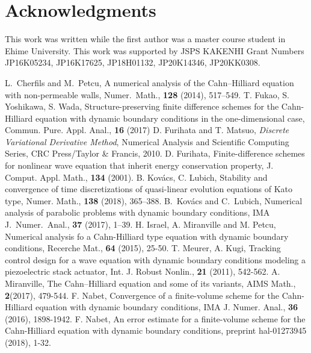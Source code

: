 \documentclass[dvipdfmx-if-dvi,autodetect-engine,ja=standard]{amsart}
\numberwithin{equation}{section} %
\begin{document}
\section*{Acknowledgments}
This work was written while
the first author was a master course student in
Ehime University.
This work was supported by JSPS KAKENHI Grant Numbers 
JP16K05234,
JP16K17625,
JP18H01132,
JP20K14346, 
JP20KK0308.








\begin{thebibliography}{9}
  L.\ Cherfils and M.\ Petcu, \textrm{A numerical analysis of the Cahn--Hilliard equation with non-permeable walls, } Numer.\ Math., {\bf 128} (2014), 517--549. 
   T. Fukao, S. Yoshikawa, S. Wada, Structure-preserving finite difference schemes for the Cahn-Hilliard equation with dynamic boundary conditions in the one-dimensional case, Commun. Pure. Appl. Anal., \textbf{16} (2017)
   D. Furihata and T. Matsuo, {\it Discrete Variational Derivative Method}, Numerical Analysis and Scientific Computing Series, CRC Press/Taylor \& Francis, 2010. 
   D. Furihata, Finite-difference schemes for nonlinear wave equation that inherit energy conservation property, J. Comput. Appl. Math., \textbf{134} (2001).
   B. Kov{\'{a}}cs, C. Lubich, \textrm{Stability and convergence of time discretizations of quasi-linear evolution equations of Kato type, } 
  Numer. Math., \textbf{138} (2018), 365--388. 
   B.\ Kov\'{a}cs and C.\ Lubich, \textrm{Numerical analysis of parabolic problems with dynamic boundary conditions, }IMA J.\ Numer.\ Anal., {\bf 37} (2017), 1--39. 
   H. Israel, A. Miranville and M. Petcu, Numerical analysis fo a Cahn-Hilliard type equation with dynamic boundary conditions, Recerche Mat., \textbf{64} (2015), 25-50.  
   T. Meurer, A. Kugi, Tracking control design for a wave equation with dynamic boundary conditions modeling a piezoelectric stack actuator, Int. J. Robust Nonlin., \textbf{21} (2011), 542-562.  
   A. Miranville, The Cahn--Hilliard equation and some of its variants, AIMS Math., \textbf{2}(2017), 479-544. 
   F. Nabet, Convergence of a finite-volume scheme for the Cahn-Hilliard equation with dynamic boundary conditions, IMA J. Numer. Anal., \textbf{36} (2016), 1898-1942. 
  F. Nabet, An error estimate for a finite-volume scheme for the Cahn-Hilliard equation with dynamic boundary conditions, preprint hal-01273945 (2018), 1-32. 

\end{thebibliography}
\end{document}

